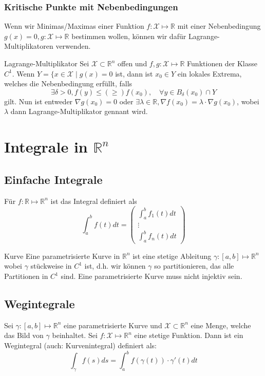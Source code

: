 \documentclass[a4paper,10pt]{article}
\def\R{\mathbb{R}}
\def\X{\mathcal{X}}
\begin{document}
\subsubsection*{Kritische Punkte mit Nebenbedingungen}
Wenn wir Minimas/Maximas einer Funktion \(f: \X \mapsto \R\) mit einer Nebenbedingung \(g(x) = 0, g: \X \mapsto \R\) bestimmen wollen, können wir dafür Lagrange-Multiplikatoren verwenden.
\begin{subbox}{Lagrange-Multiplikator}
  Sei \(\X \subset \R^n\) offen und \(f,g: \X \mapsto \R\) Funktionen der Klasse \(C^1\). Wenn \(Y = \{x \in \X \mid g(x) = 0\) ist, dann ist \(x_0 \in Y\) ein lokales Extrema, welches die Nebenbedingung erfüllt, falls 
  \[\exists \delta > 0, f(y) \le (\ge) f(x_0), \quad \forall y \in B_\delta(x_0) \cap Y\]
  gilt. Nun ist entweder \(\nabla g(x_0) = 0\) oder \(\exists \lambda \in \R, \nabla f(x_0) = \lambda \cdot \nabla g(x_0)\), wobei \(\lambda\) dann Lagrange-Multiplikator gennant wird.
\end{subbox}
\section{Integrale in \texorpdfstring{\(\R^n\)}{Rⁿ}}
\subsection{Einfache Integrale}
Für \(f: \R \mapsto \R^n\) ist das Integral definiert als
\[\int_a^b f(t)dt = 
\begin{pmatrix*}
  \int_a^b f_1(t) dt \\
  \vdots\\
  \int_a^b f_n(t) dt
\end{pmatrix*}
\]

\begin{mainbox}{Kurve}
  Eine parametrisierte Kurve in \(\R^n\) ist eine stetige Ableitung \(\gamma: \left[a,b\right] \mapsto \R^n\) wobei \(\gamma\) stückweise in \(C^1\) ist, d.h. wir können \(\gamma\) so partitionieren, das alle Partitionen in \(C^1\) sind. Eine parametrisierte Kurve muss nicht injektiv sein.
\end{mainbox}
\subsection{Wegintegrale}
Sei \(\gamma : \left[a,b\right] \mapsto \R^n\) eine parametrisierte Kurve und \(\X \subset \R^n\) eine Menge, welche das Bild von \(\gamma\) beinhaltet. Sei \(f : \X \mapsto \R^n\) eine stetige Funktion. Dann ist ein Wegintegral (auch: Kurvenintegral) definiert als:
\[\int_\gamma f(s) ds = \int_a^b f(\gamma(t)) \cdot \gamma'(t) dt\]
\end{document}
